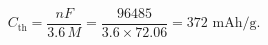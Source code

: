 \documentclass[preview]{standalone}
\begin{document}
\[C_\text{th} = \frac{nF}{3.6\,M} = \frac{96485}{3.6 \times 72.06} = 372 \text{ mAh/g}.\]
\end{document}
